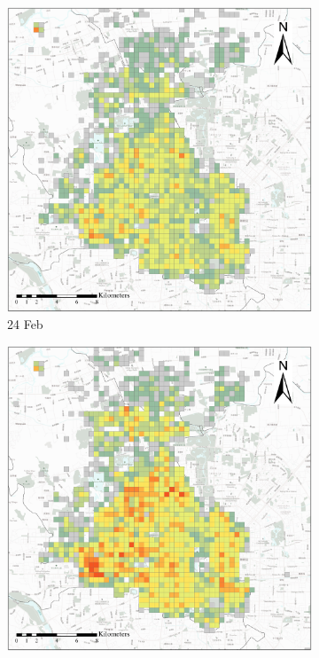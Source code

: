 \documentclass[preprints,ijgi,submit,moreauthors]{Definitions/mdpi}
\begin{document}
\begin{figure}[ht]
    \vspace{6pt}
    \begin{subfigure}{.23\textwidth}
        \includegraphics[width=\textwidth]{Figures/Overall_spatial_patterns/FN5_D2020_02_22.eps}
        \caption{24 Feb}
    \end{subfigure}
    \begin{subfigure}{.23\textwidth}
        \includegraphics[width=\textwidth]{Figures/Overall_spatial_patterns/FN5_D2020_02_26.eps}

\end{subfigure}
\end{figure}
\end{document}
